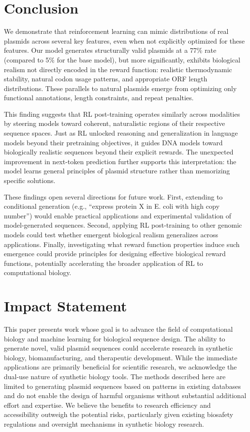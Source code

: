 \documentclass{article}
\theoremstyle{plain}
\theoremstyle{definition}
\theoremstyle{remark}
\begin{document}
\section{Conclusion}

We demonstrate that reinforcement learning can mimic distributions of real plasmids 
across several key features, even when not explicitly optimized for these features. Our model
generates structurally valid plasmids at a 77\% rate (compared to 5\% for
the base model), but more significantly, exhibits biological realism not
directly encoded in the reward function: realistic thermodynamic
stability, natural codon usage patterns, and appropriate ORF length
distributions. These parallels to natural plasmids emerge from optimizing
only functional annotations, length constraints, and repeat penalties.

This finding suggests that RL post-training operates similarly across
modalities by steering models toward coherent, naturalistic regions of
their respective sequence spaces. Just as RL unlocked reasoning and
generalization in language models beyond their pretraining objectives, it
guides DNA models toward biologically realistic sequences beyond their
explicit rewards. The unexpected improvement in next-token prediction
further supports this interpretation: the model learns general principles
of plasmid structure rather than memorizing specific solutions.

These findings open several directions for future work. First, extending
to conditional generation (e.g., ``express protein X in E. coli with high
copy number'') would enable practical applications and experimental
validation of model-generated sequences. Second, applying RL post-training
to other genomic models could test whether emergent biological realism generalizes across
applications. Finally, investigating what reward function properties induce
such emergence could provide principles for designing effective biological
reward functions, potentially accelerating the broader application of RL
to computational biology.

\section*{Impact Statement}

This paper presents work whose goal is to advance the field of
computational biology and machine learning for biological sequence
design. The ability to generate novel, valid plasmid sequences could
accelerate research in synthetic biology, biomanufacturing, and
therapeutic development. While the immediate applications are primarily
beneficial for scientific research, we acknowledge the dual-use nature
of synthetic biology tools. The methods described here are limited to
generating plasmid sequences based on patterns in existing databases and
do not enable the design of harmful organisms without substantial
additional effort and expertise. We believe the benefits to research
efficiency and accessibility outweigh the potential risks, particularly
given existing biosafety regulations and oversight mechanisms in
synthetic biology research.
\end{document}
